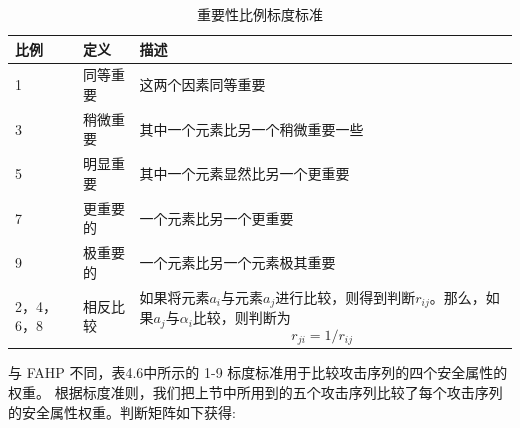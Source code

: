 \begin{table}
  \caption{重要性比例标度标准}
\begin{center}
    \begin{tabular}{|p{}<{\raggedright}|p{}<{\raggedright}|p{}<{\raggedright}|}
     \hline
      比例 & 定义 & 描述 \\\hline
      1 & 同等重要 & 这两个因素同等重要 \\\hline
      3 & 稍微重要 & 其中一个元素比另一个稍微重要一些 \\\hline
      5 & 明显重要 & 其中一个元素显然比另一个更重要 \\\hline
      7 & 更重要的 & 一个元素比另一个更重要 \\\hline
      9 & 极重要的 & 一个元素比另一个元素极其重要 \\\hline
      2，4，6，8 & 相反比较 & 如果将元素$a_i$与元素$a_j$进行比较，则得到判断$r_{i j}$。那么，如果$a_j$与$\alpha_i$比较，则判断为$$r_{j i}=1 / r_{i j}$$
      \\\hline  
    \end{tabular}
  \end{center}
\end{table}
与 FAHP 不同，表4.6中所示的 1-9 标度标准用于比较攻击序列的四个安全属性的权重。
根据标度准则，我们把上节中所用到的五个攻击序列比较了每个攻击序列的安全属性权重。判断矩阵如下获得:
